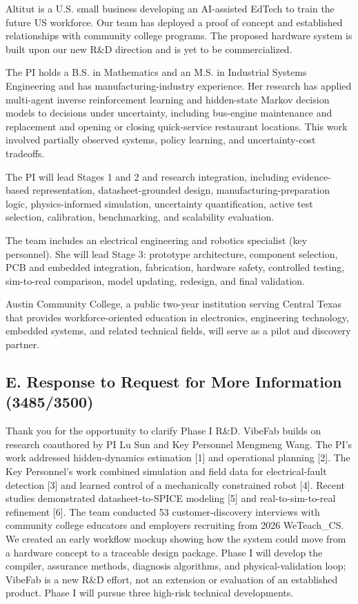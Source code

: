 \documentclass[12pt,letterpaper]{article}
\begin{document}
Altitut is a U.S. small business developing an AI-assisted EdTech to train the future US workforce. 
Our team has deployed a proof of concept and established relationships with community college programs. 
The proposed hardware system is built upon our new R\&D direction and is yet to be commercialized.

The PI holds a B.S. in Mathematics and an M.S. in Industrial Systems Engineering and has manufacturing-industry experience. 
Her research has applied multi-agent inverse reinforcement learning and hidden-state Markov decision models to decisions under uncertainty, including bus-engine maintenance and replacement and opening or closing quick-service restaurant locations. 
This work involved partially observed systems, policy learning, and uncertainty-cost tradeoffs.

The PI will lead Stages 1 and 2 and research integration, including evidence-based representation, datasheet-grounded design, manufacturing-preparation logic, physics-informed simulation, uncertainty quantification, active test selection, calibration, benchmarking, and scalability evaluation.

The team includes an electrical engineering and robotics specialist (key personnel). She will lead Stage 3: prototype architecture, component selection, PCB and embedded integration, fabrication, hardware safety, controlled testing, sim-to-real comparison, model updating, redesign, and final validation.

Austin Community College, a public two-year institution serving Central Texas that provides workforce-oriented education in electronics, engineering technology, embedded systems, and related technical fields, will serve as a pilot and discovery partner.

\subsection{E. Response to Request for More Information (3485/3500)}

Thank you for the opportunity to clarify Phase I R\&D. 
VibeFab builds on research coauthored by PI Lu Sun and Key Personnel Mengmeng Wang. 
The PI’s work addressed hidden-dynamics estimation [1] and operational planning [2]. 
The Key Personnel’s work combined simulation and field data for electrical-fault detection [3] and learned control of a mechanically constrained robot [4]. 
Recent studies demonstrated datasheet-to-SPICE modeling [5] and real-to-sim-to-real refinement [6]. 
The team conducted 53 customer-discovery interviews with community college educators and employers recruiting from 2026 WeTeach\_CS. 
We created an early workflow mockup showing how the system could move from a hardware concept to a traceable design package. 
Phase I will develop the compiler, assurance methods, diagnosis algorithms, and physical-validation loop; VibeFab is a new R\&D effort, not an extension or evaluation of an established product. 
Phase I will pursue three high-risk technical developments. 
\end{document}
